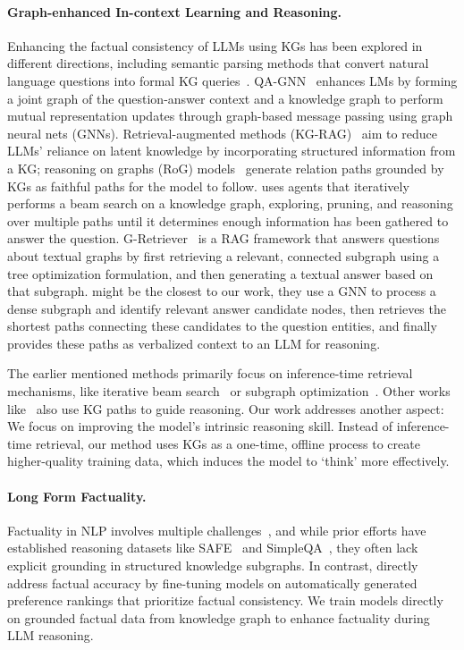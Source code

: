 \documentclass[11pt]{article}
\begin{document}
\paragraph{Graph-enhanced In-context Learning and Reasoning.}
Enhancing the factual consistency of LLMs using KGs has been explored in different directions, including semantic parsing methods that convert natural language questions into formal KG queries~\citep{lanquery,ye2021rng}. QA-GNN~\cite{yasunaga-etal-2021-qa} enhances LMs by forming a joint graph of the question-answer context and a knowledge graph to perform mutual representation updates through graph-based message passing using graph neural nets (GNNs). Retrieval-augmented methods (KG-RAG)~\citep{li2023graph,jiang2023reasoninglm,sanmartin2024kg,sun2024thinkongraph,he2024g} aim to reduce LLMs' reliance on latent knowledge by incorporating structured information from a KG; reasoning on graphs (RoG) models~\citep{luo2023reasoning} generate relation paths grounded by KGs as faithful paths for the model to follow. \citet{sun2024thinkongraph} uses agents that iteratively performs a beam search on a knowledge graph, exploring, pruning, and reasoning over multiple paths until it determines enough information has been gathered to answer the question. G-Retriever~\citep{he2024g} is a RAG framework that answers questions about textual graphs by first retrieving a relevant, connected subgraph using a tree optimization formulation, and then generating a textual answer based on that subgraph. \citet{mavromatis-karypis-2025-gnn} might be the closest to our work, they use a GNN to process a dense subgraph and identify relevant answer candidate nodes, then retrieves the shortest paths connecting these candidates to the question entities, and finally provides these paths as verbalized context to an LLM for reasoning.

The earlier mentioned methods primarily focus on inference-time retrieval mechanisms, like iterative beam search~\citep{sun2024thinkongraph} or subgraph optimization~\citep{he2024g, mavromatis-karypis-2025-gnn}. Other works like~\citet{tan2025paths} also use KG paths to guide reasoning. Our work addresses another aspect: We focus on improving the model's intrinsic reasoning skill. Instead of inference-time retrieval, our method uses KGs as a one-time, offline process to create higher-quality training data, which induces the model to `think' more effectively.

\paragraph{Long Form Factuality.}
Factuality in NLP involves multiple challenges~\citep{augenstein2024factuality}, and while prior efforts have established reasoning datasets like SAFE~\citep{wei2024longform} and SimpleQA~\citep{wei2024measuring}, they often lack explicit grounding in structured knowledge subgraphs. In contrast, \citet{tian2024finetuning} directly address factual accuracy by fine-tuning models on automatically generated preference rankings that prioritize factual consistency. We train models directly on grounded factual data from knowledge graph to enhance factuality during LLM reasoning.
\end{document}
